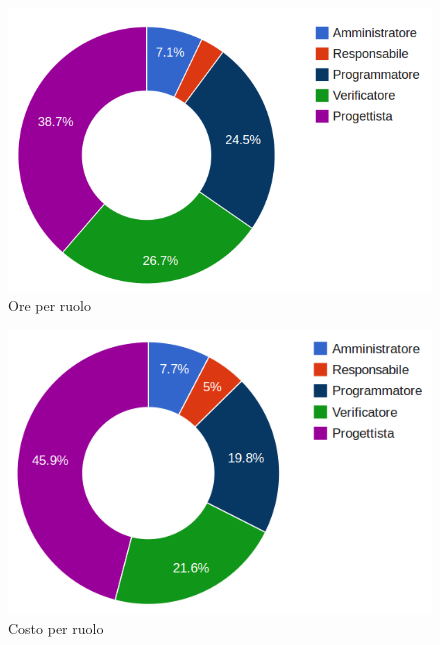\begin{figure}[H]
\centering
\includegraphics[scale=0.35]{5-5-1.png}
\caption{Ore per ruolo\label{fig:nome}}
\end{figure}

\begin{figure}[H]
\centering
\includegraphics[scale=0.4]{5-5-2.png}
\caption{Costo per ruolo\label{fig:nome}}
\end{figure}
